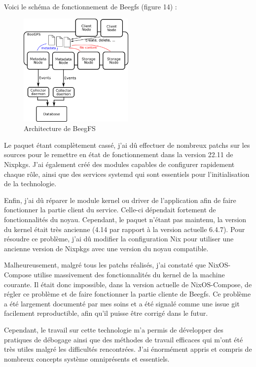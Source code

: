\documentclass[a4paper,french,12pt, titlepage]{article}
\begin{document}
Voici le schéma de fonctionnement de Beegfs (figure 14) :

\begin{figure}[h]
\centering
\includegraphics[width=0.5\textwidth,height=0.5\textheight,keepaspectratio]{images/shema-beegfs.png}
\caption{Architecture de BeegFS}
\end{figure}

Le paquet étant complètement cassé, j'ai dû effectuer de nombreux patchs
sur les sources pour le remettre en état de fonctionnement dans la
version 22.11 de Nixpkgs. J'ai également créé des modules capables de
configurer rapidement chaque rôle, ainsi que des services systemd qui
sont essentiels pour l'initialisation de la technologie.\newline

Enfin, j'ai dû réparer le module kernel ou driver de l'application afin
de faire fonctionner la partie client du service. Celle-ci dépendait
fortement de fonctionnalités du noyau. Cependant, le paquet n'étant pas
maintenu, la version du kernel était très ancienne (4.14 par rapport à
la version actuelle 6.4.7). Pour résoudre ce problème, j'ai dû modifier
la configuration Nix pour utiliser une ancienne version de Nixpkgs avec
une version du noyau compatible.\newline

Malheureusement, malgré tous les patchs réalisés, j'ai constaté que
NixOS-Compose utilise massivement des fonctionnalités du kernel de la
machine courante. Il était donc impossible, dans la version actuelle de
NixOS-Compose, de régler ce problème et de faire fonctionner la partie
cliente de Beegfs. Ce problème a été largement documenté par mes soins
et a été signalé comme une issue git facilement reproductible, afin
qu'il puisse être corrigé dans le futur.\newline

Cependant, le travail sur cette technologie m'a permis de développer des
pratiques de débogage ainsi que des méthodes de travail efficaces qui
m'ont été très utiles malgré les difficultés rencontrées. J'ai
énormément appris et compris de nombreux concepts système omniprésents
et essentiels.
\end{document}
